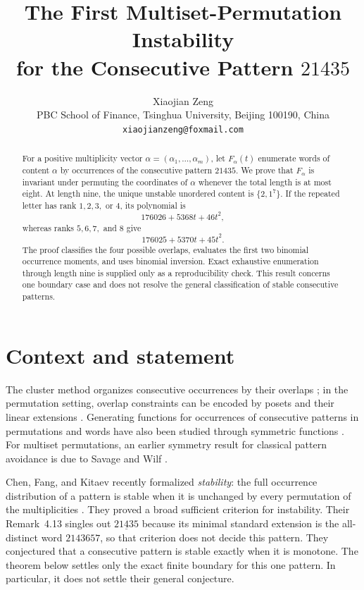 \documentclass[11pt]{article}
\title{The First Multiset-Permutation Instability\\
for the Consecutive Pattern $21435$}
\author{Xiaojian Zeng\\
\small PBC School of Finance, Tsinghua University, Beijing 100190, China\\
\small \texttt{xiaojianzeng@foxmail.com}}
\date{}
\begin{document}
\maketitle

\begin{abstract}
For a positive multiplicity vector $\alpha=(\alpha_1,\ldots,\alpha_m)$,
let $F_\alpha(t)$ enumerate words of content $\alpha$ by occurrences of the
consecutive pattern $21435$.  We prove that $F_\alpha$ is invariant under
permuting the coordinates of $\alpha$ whenever the total length is at most
eight.  At length nine, the unique unstable unordered content is
$\{2,1^7\}$.  If the repeated letter has rank $1,2,3,$ or $4$, its polynomial
is
\[
  176026+5368t+46t^2,
\]
whereas ranks $5,6,7,$ and $8$ give
\[
  176025+5370t+45t^2.
\]
The proof classifies the four possible overlaps, evaluates the first two
binomial occurrence moments, and uses binomial inversion.  Exact exhaustive
enumeration through length nine is supplied only as a reproducibility check.
This result concerns one boundary case and does not resolve the general
classification of stable consecutive patterns.
\end{abstract}

\section{Context and statement}

The cluster method organizes consecutive occurrences by their overlaps
\cite{GouldenJackson1979}; in the permutation setting, overlap constraints can
be encoded by posets and their linear extensions
\cite{ElizaldeNoy2012}.  Generating functions for occurrences of consecutive
patterns in permutations and words have also been studied through symmetric
functions \cite{MendesRemmel2006}.  For multiset permutations, an earlier
symmetry result for classical pattern avoidance is due to Savage and Wilf
\cite{SavageWilf2006}.

Chen, Fang, and Kitaev recently formalized \emph{stability}: the full
occurrence distribution of a pattern is stable when it is unchanged by every
permutation of the multiplicities \cite{ChenFangKitaev2026}.  They proved a
broad sufficient criterion for instability.  Their Remark~4.13 singles out
$\underline{21435}$ because its minimal standard extension is the
all-distinct word $2143657$, so that criterion does not decide this pattern.
They conjectured that a consecutive pattern is stable exactly when it is
monotone.  The theorem below settles only the exact finite boundary for this
one pattern.  In particular, it does not settle their general conjecture.
\end{document}

